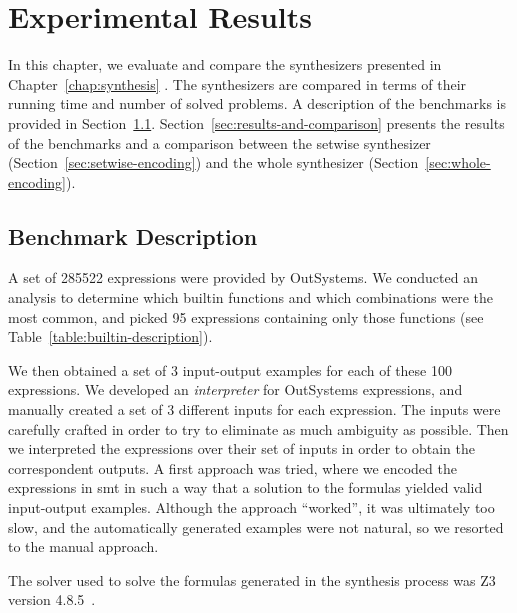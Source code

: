 \chapter{Experimental Results}
\label{chap:experimental-results}

In this chapter, we evaluate and compare the synthesizers presented in
Chapter~\ref{chap:synthesis} .
The synthesizers are compared in terms of their running time and number of
solved problems.
A description of the benchmarks is provided in Section~\ref{sec:bench-desc}.
Section~\ref{sec:results-and-comparison} presents the results of the benchmarks
and a comparison between the setwise synthesizer
(Section~\ref{sec:setwise-encoding}) and the whole synthesizer
(Section~\ref{sec:whole-encoding}).

\section{Benchmark Description}
\label{sec:bench-desc}

A set of 285522 expressions were provided by OutSystems.
We conducted an analysis to determine which builtin functions and which
combinations were the most common, and picked 95 expressions containing only
those functions (see Table~\ref{table:builtin-description}).

We then obtained a set of 3 input-output examples for each of these 100
expressions.
We developed an \textit{interpreter} for OutSystems expressions, and manually
created a set of 3 different inputs for each expression.
The inputs were carefully crafted in order to try to eliminate as much ambiguity
as possible.
Then we interpreted the expressions over their set of inputs in order to
obtain the correspondent outputs.
A first approach was tried, where we encoded the expressions in \gls{smt} in
such a way that a solution to the formulas yielded valid input-output examples.
Although the approach ``worked'', it was ultimately too slow, and the
automatically generated examples were not natural, so we resorted to the manual
approach.

The solver used to solve the formulas generated in the synthesis process was Z3
version 4.8.5~\cite{DeMoura:2008:ZES}.



